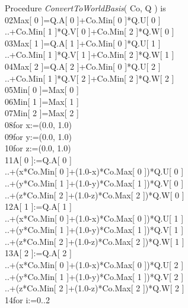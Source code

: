 \documentclass[12pt, a4paper]{article}
\begin{document}
\begin{ttfamily}
\quad Procedure {\em ConvertToWorldBasis}( Co, Q ) is\\
02\quad\quad Max[ 0 ]=Q.A[ 0 ]+Co.Min[ 0 ]*Q.U[ 0 ]\\
..\quad\quad\quad +Co.Min[ 1 ]*Q.V[ 0 ]+Co.Min[ 2 ]*Q.W[ 0 ]\\
03\quad\quad Max[ 1 ]=Q.A[ 1 ]+Co.Min[ 0 ]*Q.U[ 1 ]\\
..\quad\quad\quad +Co.Min[ 1 ]*Q.V[ 1 ]+Co.Min[ 2 ]*Q.W[ 1 ]\\
04\quad\quad Max[ 2 ]=Q.A[ 2 ]+Co.Min[ 0 ]*Q.U[ 2 ]\\
..\quad\quad\quad +Co.Min[ 1 ]*Q.V[ 2 ]+Co.Min[ 2 ]*Q.W[ 2 ]\\
05\quad\quad Min[ 0 ]=Max[ 0 ]\\
06\quad\quad Min[ 1 ]=Max[ 1 ]\\
07\quad\quad Min[ 2 ]=Max[ 2 ]\\
08\quad\quad for x:=(0.0, 1.0)\\
09\quad\quad\quad for y:=(0.0, 1.0)\\
10\quad\quad\quad\quad for z:=(0.0, 1.0)\\
11\quad\quad\quad\quad\quad A[ 0 ]:=Q.A[ 0 ]\\
..\quad\quad\quad\quad\quad\quad +(x*Co.Min[ 0 ]+(1.0-x)*Co.Max[ 0 ])*Q.U[ 0 ]\\
..\quad\quad\quad\quad\quad\quad +(y*Co.Min[ 1 ]+(1.0-y)*Co.Max[ 1 ])*Q.V[ 0 ]\\
..\quad\quad\quad\quad\quad\quad +(z*Co.Min[ 2 ]+(1.0-z)*Co.Max[ 2 ])*Q.W[ 0 ]\\
12\quad\quad\quad\quad\quad A[ 1 ]:=Q.A[ 1 ]\\
..\quad\quad\quad\quad\quad\quad +(x*Co.Min[ 0 ]+(1.0-x)*Co.Max[ 0 ])*Q.U[ 1 ]\\
..\quad\quad\quad\quad\quad\quad +(y*Co.Min[ 1 ]+(1.0-y)*Co.Max[ 1 ])*Q.V[ 1 ]\\
..\quad\quad\quad\quad\quad\quad +(z*Co.Min[ 2 ]+(1.0-z)*Co.Max[ 2 ])*Q.W[ 1 ]\\
13\quad\quad\quad\quad\quad A[ 2 ]:=Q.A[ 2 ]\\
..\quad\quad\quad\quad\quad\quad +(x*Co.Min[ 0 ]+(1.0-x)*Co.Max[ 0 ])*Q.U[ 2 ]\\
..\quad\quad\quad\quad\quad\quad +(y*Co.Min[ 1 ]+(1.0-y)*Co.Max[ 1 ])*Q.V[ 2 ]\\
..\quad\quad\quad\quad\quad\quad +(z*Co.Min[ 2 ]+(1.0-z)*Co.Max[ 2 ])*Q.W[ 2 ]\\
14\quad\quad\quad\quad\quad for i:=0..2\\

\end{ttfamily}
\end{document}

